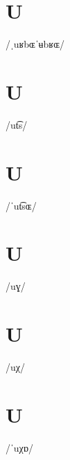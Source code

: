 \documentclass[10pt,a4paper,twoside]{book}
\begin{document}
\section*{U}

\begin{multicols}{3}
 {/ˌuʁbɶˈʉbʁɶ/} {}
\end{multicols}

\section*{U}

\begin{multicols}{3}
 {/ut͡s/} {}
\end{multicols}

\section*{U}

\begin{multicols}{3}
 {/ˈut͡sɶ/} {}
\end{multicols}

\section*{U}

\begin{multicols}{3}
 {/uɣ/} {}
\end{multicols}

\section*{U}

\begin{multicols}{3}
 {/uχ/} {}
\end{multicols}

\section*{U}

\begin{multicols}{3}
 {/ˈuχɒ/} {}
\end{multicols}
\end{document}
